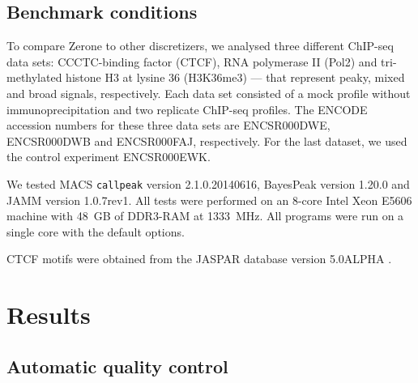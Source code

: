 \documentclass{bioinfo}
\begin{document}
\begin{methods}
\subsection{Benchmark conditions}
To compare Zerone to other discretizers, we analysed three different
ChIP-seq data sets: CCCTC-binding factor (CTCF), RNA polymerase II
(Pol2) and tri-methylated histone H3 at lysine 36 (H3K36me3) --- that
represent peaky, mixed and broad signals, respectively. Each
data set consisted of a mock profile without immunoprecipitation
and two replicate ChIP-seq profiles.
The ENCODE accession numbers for these three data sets are
ENCSR000DWE, ENCSR000DWB and ENCSR000FAJ, respectively. For the last dataset,
we used the control experiment ENCSR000EWK.

We tested MACS \texttt{callpeak} version 2.1.0.20140616, BayesPeak
version 1.20.0 and JAMM version 1.0.7rev1. All tests were performed on
an 8-core Intel Xeon E5606 machine with 48~GB of DDR3-RAM at 1333~MHz.
All programs were run on a single core with the default options.

CTCF motifs were obtained from the JASPAR database version
5.0{\textunderscore}ALPHA \citep{pmid24194598}.

\end{methods}

\section{Results}
\label{sec:results}

\subsection{Automatic quality control}
\end{document}
